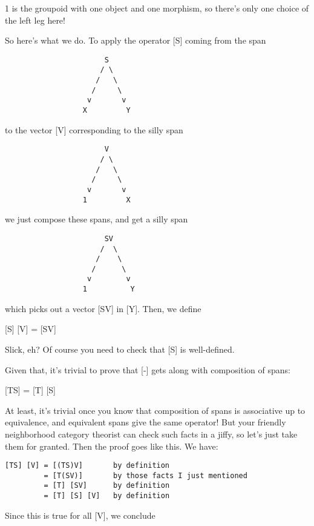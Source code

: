 1 is the groupoid with one object and one morphism, so there's 
only one choice of the left leg here!

So here's what we do.  To apply the operator [S] coming from 
the span

\begin{verbatim}
                       S
                      / \
                     /   \
                    /     \
                   v       v
                  X         Y
\end{verbatim}
    
to the vector [V] corresponding to the silly span

\begin{verbatim}
                       V
                      / \
                     /   \
                    /     \
                   v       v
                  1         X
\end{verbatim}
    
we just compose these spans, and get a silly span

\begin{verbatim}
                       SV
                      /  \
                     /    \
                    /      \
                   v        v
                  1          Y
\end{verbatim}
    
which picks out a vector [SV] in [Y].  Then, we define

[S] [V] = [SV]

Slick, eh?  Of course you need to check that [S] is well-defined.

Given that, it's trivial to prove that [-] gets along with 
composition of spans:

[TS] = [T] [S]

At least, it's trivial once you know that composition of spans is 
associative up to equivalence, and equivalent spans give the same 
operator!  But your friendly neighborhood category theorist can check
such facts in a jiffy, so let's just take them for granted.  Then 
the proof goes like this.  We have:

\begin{verbatim}
[TS] [V] = [(TS)V]       by definition 
         = [T(SV)]       by those facts I just mentioned
         = [T] [SV]      by definition 
         = [T] [S] [V]   by definition 
\end{verbatim}
    
Since this is true for all [V], we conclude

